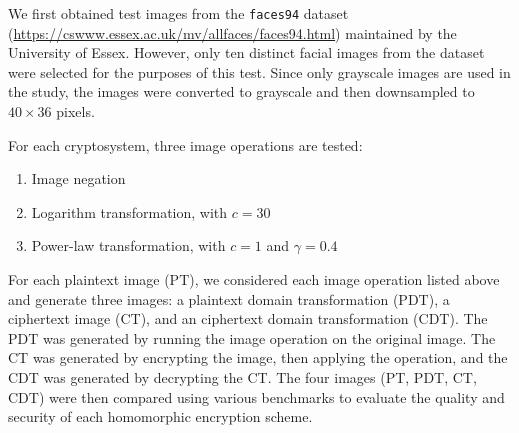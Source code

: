 We first obtained test images from the \texttt{faces94} dataset (\url{https://cswww.essex.ac.uk/mv/allfaces/faces94.html}) maintained by the University of Essex. However, only ten distinct facial images from the dataset were selected for the purposes of this test. Since only grayscale images are used in the study, the images were converted to grayscale and then downsampled to $40 \times 36$ pixels.

For each cryptosystem, three image operations are tested:
\begin{enumerate}
	\item Image negation
	\item Logarithm transformation, with $c = 30$
	\item Power-law transformation, with $c = 1$ and $\gamma = 0.4$
\end{enumerate}

For each plaintext image (PT), we considered each image operation listed above and generate three images: a plaintext domain transformation (PDT), a ciphertext image (CT), and an ciphertext domain transformation (CDT). The PDT was generated by running the image operation on the original image. The CT was generated by encrypting the image, then applying the operation, and the CDT was generated by decrypting the CT. The four images (PT, PDT, CT, CDT) were then compared using various benchmarks to evaluate the quality and security of each homomorphic encryption scheme.


